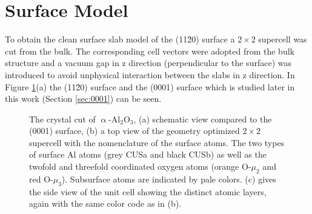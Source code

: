 \documentclass[11pt,DIV=13,BCOR=5mm,a4paper,headinclude]{scrbook}
\begin{document}
\section{Surface Model}
To obtain the clean surface slab model of the (11\=20) surface a $2\times 2$ supercell was cut from the bulk.
The corresponding cell vectors were adopted from the bulk structure and a vacuum gap in z direction (perpendicular to the surface) was introduced to avoid unphysical interaction between the slabs in z direction.
In Figure \ref{abb:crystal_11-20}(a) the (11\=20) surface and the (0001) surface which is studied later in this work (Section \ref{sec:0001}) can be seen.
\begin{figure}[!h]
    \centering
             \quad
             \quad
             \caption{The crystal cut of $\upalpha$-Al$_2$O$_3$, (a) schematic view compared to the (0001) surface, (b) a top view of the geometry optimized $2\times 2$ supercell with the nomenclature of the surface atoms.
The two types of surface Al atoms (grey CUSa and black CUSb) as well as the twofold and threefold coordinated oxygen atoms (orange O-$\mu_2$ and red O-$\mu_3$).
Subsurface atoms are indicated by pale colors.
(c) gives the side view of the unit cell showing the distinct atomic layers, again with the same color code as in (b).}
            \label{abb:crystal_11-20}
\end{figure}
\end{document}
